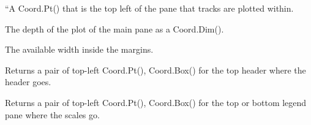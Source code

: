 \documentclass[letterpaper,10pt,english]{sphinxmanual}
\begin{document}
\begin{fulllineitems}
\begin{fulllineitems}
\label{\detokenize{ref/util/plot/Plot:TotalDepth.util.plot.Plot.PlotRoll.trackTopLeft}}
“A Coord.Pt() that is the top left of the pane that tracks are
plotted within.

\end{fulllineitems}


\begin{fulllineitems}
\label{\detokenize{ref/util/plot/Plot:TotalDepth.util.plot.Plot.PlotRoll.mainPanePlotDepth}}
The depth of the plot of the main pane as a Coord.Dim().

\end{fulllineitems}


\begin{fulllineitems}
\label{\detokenize{ref/util/plot/Plot:TotalDepth.util.plot.Plot.PlotRoll.availableWidth}}
The available width inside the margins.

\end{fulllineitems}


\begin{fulllineitems}
\label{\detokenize{ref/util/plot/Plot:TotalDepth.util.plot.Plot.PlotRoll.retHeadPane}}
Returns a pair of top-left Coord.Pt(), Coord.Box() for the top
header where the header goes.

\end{fulllineitems}


\begin{fulllineitems}
\label{\detokenize{ref/util/plot/Plot:TotalDepth.util.plot.Plot.PlotRoll.retLegendPane}}
Returns a pair of top-left Coord.Pt(), Coord.Box() for the top or bottom
legend pane where the scales go.

\end{fulllineitems}


\end{fulllineitems}
\end{document}
